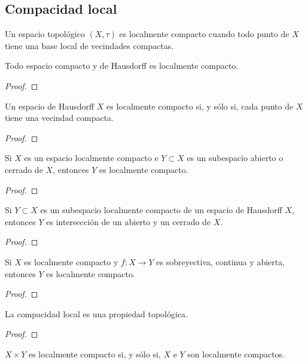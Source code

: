 \subsection{Compacidad local}

\begin{definición}
    Un espacio topológico $(X, \tau)$ es localmente compacto cuando todo punto de $X$ tiene una base local de vecindades compactas.
\end{definición}
\begin{corolario}
    Todo espacio compacto y de Hausdorff es localmente compacto.
\end{corolario}
\begin{proof}
\end{proof}
\begin{proposición}
    Un espacio de Hausdorff $X$ es localmente compacto si, y sólo si, cada punto de $X$ tiene una vecindad compacta.
\end{proposición}
\begin{proof}
\end{proof}
\begin{proposición}
    Si $X$ es un espacio localmente compacto e $Y \subset X$ es un subespacio abierto o cerrado de $X$, entonces $Y$ es localmente compacto.
\end{proposición}
\begin{proof}
\end{proof}
\begin{proposición}
    Si $Y \subset X$ es un subespacio localmente compacto de un espacio de Hausdorff $X$, entonces $Y$ es intersección de un abierto y un cerrado de $X$.
\end{proposición}
\begin{proof}
\end{proof}
\begin{proposición}
    Si $X$ es localmente compacto y $f: X \to Y$ es sobreyectiva, continua y abierta, entonces $Y$ es localmente compacto.
\end{proposición}
\begin{proof}
\end{proof}
\begin{corolario}
    La compacidad local es una propiedad topológica.
\end{corolario}
\begin{proof}
\end{proof}
\begin{proposición}
    $X \times Y$ es localmente compacto si, y sólo si, $X$ e $Y$ son localmente compactos.
\end{proposición}
